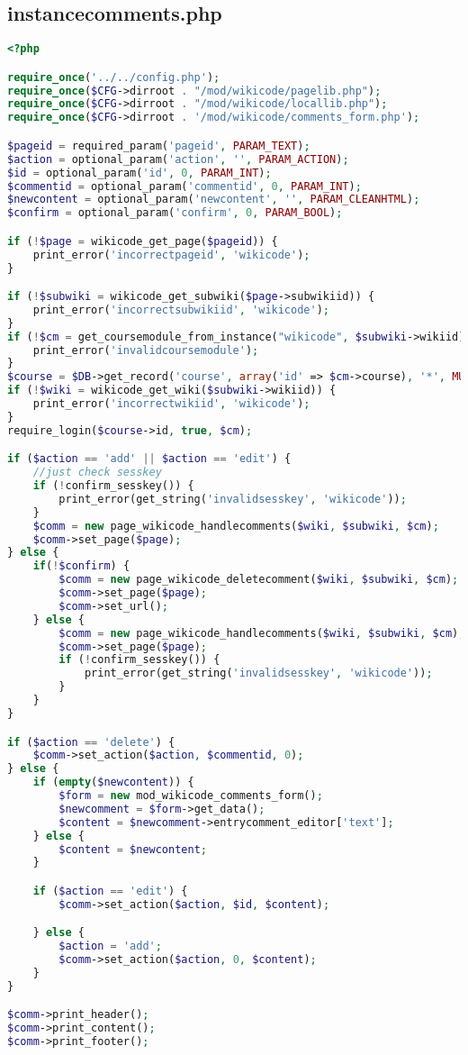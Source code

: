 \subsection{instancecomments.php}
\begin{lstlisting}[language=PHP]
<?php

require_once('../../config.php');
require_once($CFG->dirroot . "/mod/wikicode/pagelib.php");
require_once($CFG->dirroot . "/mod/wikicode/locallib.php");
require_once($CFG->dirroot . '/mod/wikicode/comments_form.php');

$pageid = required_param('pageid', PARAM_TEXT);
$action = optional_param('action', '', PARAM_ACTION);
$id = optional_param('id', 0, PARAM_INT);
$commentid = optional_param('commentid', 0, PARAM_INT);
$newcontent = optional_param('newcontent', '', PARAM_CLEANHTML);
$confirm = optional_param('confirm', 0, PARAM_BOOL);

if (!$page = wikicode_get_page($pageid)) {
    print_error('incorrectpageid', 'wikicode');
}

if (!$subwiki = wikicode_get_subwiki($page->subwikiid)) {
    print_error('incorrectsubwikiid', 'wikicode');
}
if (!$cm = get_coursemodule_from_instance("wikicode", $subwiki->wikiid)) {
    print_error('invalidcoursemodule');
}
$course = $DB->get_record('course', array('id' => $cm->course), '*', MUST_EXIST);
if (!$wiki = wikicode_get_wiki($subwiki->wikiid)) {
    print_error('incorrectwikiid', 'wikicode');
}
require_login($course->id, true, $cm);

if ($action == 'add' || $action == 'edit') {
    //just check sesskey
    if (!confirm_sesskey()) {
        print_error(get_string('invalidsesskey', 'wikicode'));
    }
    $comm = new page_wikicode_handlecomments($wiki, $subwiki, $cm);
    $comm->set_page($page);
} else {
    if(!$confirm) {
        $comm = new page_wikicode_deletecomment($wiki, $subwiki, $cm);
        $comm->set_page($page);
        $comm->set_url();
    } else {
        $comm = new page_wikicode_handlecomments($wiki, $subwiki, $cm);
        $comm->set_page($page);
        if (!confirm_sesskey()) {
            print_error(get_string('invalidsesskey', 'wikicode'));
        }
    }
}

if ($action == 'delete') {
    $comm->set_action($action, $commentid, 0);
} else {
    if (empty($newcontent)) {
        $form = new mod_wikicode_comments_form();
        $newcomment = $form->get_data();
        $content = $newcomment->entrycomment_editor['text'];
    } else {
        $content = $newcontent;
    }

    if ($action == 'edit') {
        $comm->set_action($action, $id, $content);

    } else {
        $action = 'add';
        $comm->set_action($action, 0, $content);
    }
}

$comm->print_header();
$comm->print_content();
$comm->print_footer();
\end{lstlisting}

